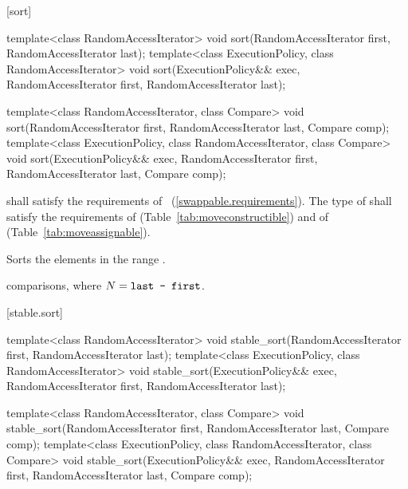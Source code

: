 [sort]{}

%
\begin{itemdecl}
template<class RandomAccessIterator>
  void sort(RandomAccessIterator first, RandomAccessIterator last);
template<class ExecutionPolicy, class RandomAccessIterator>
  void sort(ExecutionPolicy&& exec,
            RandomAccessIterator first, RandomAccessIterator last);

template<class RandomAccessIterator, class Compare>
  void sort(RandomAccessIterator first, RandomAccessIterator last,
            Compare comp);
template<class ExecutionPolicy, class RandomAccessIterator, class Compare>
  void sort(ExecutionPolicy&& exec,
            RandomAccessIterator first, RandomAccessIterator last,
            Compare comp);
\end{itemdecl}

\begin{itemdescr}
\pnum
\requires
{} shall satisfy the requirements of
~(\ref{swappable.requirements}). The type
of  shall satisfy the requirements of
 (Table~\ref{tab:moveconstructible}) and of
 (Table~\ref{tab:moveassignable}).

\pnum
\effects
Sorts the elements in the range
.

\pnum
\complexity
{} comparisons, where $N = \texttt{last - first}$.
\end{itemdescr}

[stable.sort]{}

%
\begin{itemdecl}
template<class RandomAccessIterator>
  void stable_sort(RandomAccessIterator first, RandomAccessIterator last);
template<class ExecutionPolicy, class RandomAccessIterator>
  void stable_sort(ExecutionPolicy&& exec,
                   RandomAccessIterator first, RandomAccessIterator last);

template<class RandomAccessIterator, class Compare>
  void stable_sort(RandomAccessIterator first, RandomAccessIterator last,
                   Compare comp);
template<class ExecutionPolicy, class RandomAccessIterator, class Compare>
  void stable_sort(ExecutionPolicy&& exec,
                   RandomAccessIterator first, RandomAccessIterator last,
                   Compare comp);
\end{itemdecl}

